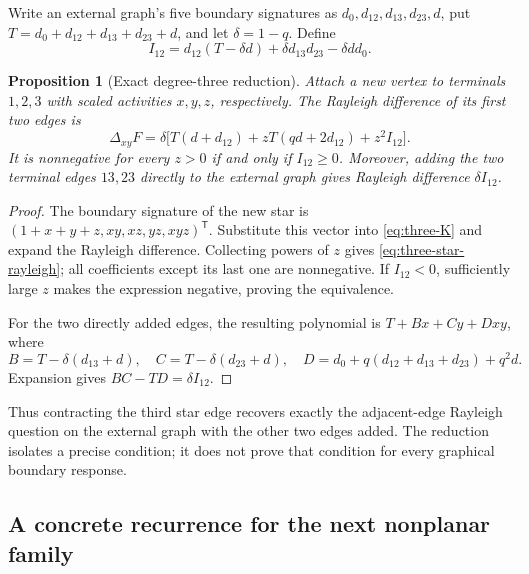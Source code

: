 \documentclass[11pt,a4paper]{article}
\newtheorem{proposition}[theorem]{Proposition}
\theoremstyle{definition}
\theoremstyle{remark}\newtheorem{remark}[theorem]{Remark}
\begin{document}
Write an external graph's five boundary signatures as
$d_0,d_{12},d_{13},d_{23},d$, put
$T=d_0+d_{12}+d_{13}+d_{23}+d$, and let $\delta=1-q$.
Define
\begin{equation}\label{eq:three-I}
 I_{12}=d_{12}(T-\delta d)
       +\delta d_{13}d_{23}-\delta dd_0.
\end{equation}

\begin{proposition}[Exact degree-three reduction]\label{prop:three-local}
Attach a new vertex to terminals $1,2,3$ with scaled activities
$x,y,z$, respectively. The Rayleigh difference of its first two
edges is
\begin{equation}\label{eq:three-star-rayleigh}
 \Delta_{xy}F
 =\delta\bigl[T(d+d_{12})+
                 zT(qd+2d_{12})+z^2I_{12}\bigr].
\end{equation}
It is nonnegative for every $z>0$ if and only if $I_{12}\ge0$.
Moreover, adding the two terminal edges $13,23$ directly to the
external graph gives Rayleigh difference $\delta I_{12}$.
\end{proposition}
\begin{proof}
The boundary signature of the new star is
$(1+x+y+z,xy,xz,yz,xyz)^{\mathsf T}$.
Substitute this vector into \eqref{eq:three-K} and expand the
Rayleigh difference. Collecting powers of $z$ gives
\eqref{eq:three-star-rayleigh}; all coefficients except its last
one are nonnegative. If $I_{12}<0$, sufficiently large $z$ makes
the expression negative, proving the equivalence.

For the two directly added edges, the resulting polynomial is
$T+Bx+Cy+Dxy$, where
\[
 B=T-\delta(d_{13}+d),\quad
 C=T-\delta(d_{23}+d),\quad
 D=d_0+q(d_{12}+d_{13}+d_{23})+q^2d.
\]
Expansion gives $BC-TD=\delta I_{12}$.
\end{proof}

Thus contracting the third star edge recovers exactly the adjacent-edge
Rayleigh question on the external graph with the other two edges added.
The reduction isolates a precise condition; it does not prove that
condition for every graphical boundary response.

\subsection{A concrete recurrence for the next nonplanar family}
\end{document}
